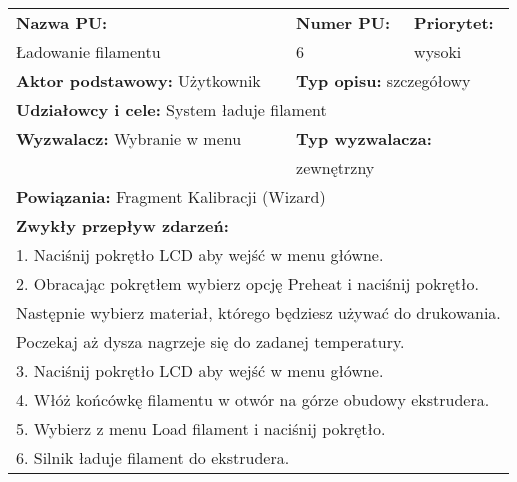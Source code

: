\documentclass{article}
\begin{document}
\begin{enumerate}[label=\arabic*.]
\newpage
\begin{tabular}{|p{5cm}|p{3cm}|p{3cm}|p{3cm}|p{}|p{3cm}|}
\hline
\multicolumn{4}{|l|}{\textbf{Nazwa PU:}} & \multicolumn{1}{l|}{\textbf{Numer PU:}} & \multicolumn{1}{|l|}{\textbf{Priorytet:} } \\ 
\multicolumn{4}{|l|}{Ładowanie filamentu} & \multicolumn{1}{l|}{6} & \multicolumn{1}{|l|}{wysoki}\\ \hline
\multicolumn{3}{|l|}{\textbf{Aktor podstawowy:} Użytkownik} & \multicolumn{3}{l|}{\textbf{Typ opisu:} szczegółowy} \\ \hline
\multicolumn{6}{|l|}{\textbf{Udziałowcy i cele:} System ładuje filament} \\ \hline
\multicolumn{3}{|l|}{\textbf{Wyzwalacz:} Wybranie w menu} & \multicolumn{3}{l|}{\textbf{Typ wyzwalacza:}} \\ 
\multicolumn{3}{|l|}{} & \multicolumn{3}{l|}{zewnętrzny} \\ \hline
\multicolumn{6}{|l|}{\textbf{Powiązania:} Fragment Kalibracji (Wizard)} \\
\hline
\multicolumn{6}{|l|}{\textbf{Zwykły przepływ zdarzeń:}} \\
\multicolumn{6}{|l|}{1. Naciśnij pokrętło LCD aby wejść w menu główne.} \\
\multicolumn{6}{|l|}{2. Obracając pokrętłem wybierz opcję Preheat i naciśnij pokrętło.} \\
\multicolumn{6}{|l|}{Następnie wybierz materiał, którego będziesz używać do drukowania.} \\
\multicolumn{6}{|l|}{Poczekaj aż dysza nagrzeje się do zadanej temperatury.} \\
\multicolumn{6}{|l|}{3. Naciśnij pokrętło LCD aby wejść w menu główne.} \\
\multicolumn{6}{|l|}{4. Włóż końcówkę filamentu w otwór na górze obudowy ekstrudera.} \\
\multicolumn{6}{|l|}{5. Wybierz z menu Load filament i naciśnij pokrętło.} \\
\multicolumn{6}{|l|}{6. Silnik ładuje filament do ekstrudera.} \\
\hline

\end{tabular}


\end{enumerate}
\end{document}
